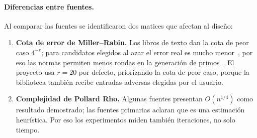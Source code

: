 \paragraph{Diferencias entre fuentes.} Al comparar las fuentes se
identificaron dos matices que afectan al diseño:
\begin{enumerate}
  \item \textbf{Cota de error de Miller--Rabin.} Los libros de texto dan la
        cota de peor caso $4^{-r}$; para candidatos elegidos al azar el error
        real es mucho menor~\cite{dlp1993}, por eso las normas permiten menos
        rondas en la generación de primos~\cite{fips186}. El proyecto usa
        $r = 20$ por defecto, priorizando la cota de peor caso, porque la
        biblioteca también recibe entradas adversas elegidas por el usuario.
  \item \textbf{Complejidad de Pollard Rho.} Algunas fuentes presentan
        $O(n^{1/4})$ como resultado demostrado; las fuentes primarias aclaran
        que es una estimación heurística. Por eso los experimentos miden
        también iteraciones, no solo tiempo.
\end{enumerate}

